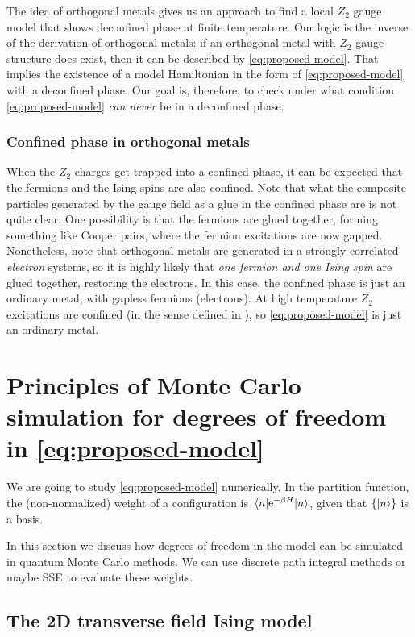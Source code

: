 \documentclass[hyperref, a4paper]{article}
\newcommand*{\ee}{\mathrm{e}}
\newcommand*{\Ztwo}{$\mathbb{Z}_2$ }
\newcommand*{\tfim}{transverse field Ising model}
\def\mathbb#1{#1}%
\begin{document}
The idea of orthogonal metals gives us an approach to find a local \Ztwo gauge model that shows deconfined phase at finite temperature.
Our logic is the inverse of the derivation of orthogonal metals: if an orthogonal metal with \Ztwo gauge structure does exist, then it can be described by \eqref{eq:proposed-model}.
That implies the existence of a model Hamiltonian in the form of \eqref{eq:proposed-model} with a deconfined phase.
Our goal is, therefore, to check under what condition \eqref{eq:proposed-model} \emph{can never} be in a deconfined phase.

\subsubsection{Confined phase in orthogonal metals}

When the \Ztwo charges get trapped into a confined phase, it can be expected that the fermions and the Ising spins are also confined.
Note that what the composite particles generated by the gauge field as a glue in the confined phase are is not quite clear.
One possibility is that the fermions are glued together, forming something like Cooper pairs, where the fermion excitations are now gapped.
Nonetheless, note that orthogonal metals are generated in a strongly correlated \emph{electron} systems, so it is highly likely that \emph{one fermion and one Ising spin} are glued together, restoring the electrons.
In this case, the confined phase is just an ordinary metal, with gapless fermions (electrons).
At high temperature \Ztwo excitations are confined (in the sense defined in ), so \eqref{eq:proposed-model} is just an ordinary metal.

\section{Principles of Monte Carlo simulation for degrees of freedom in \eqref{eq:proposed-model}}

We are going to study \eqref{eq:proposed-model} numerically.
In the partition function, the (non-normalized) weight of a configuration is $\mel{n}{\ee^{-\beta H}}{n}$, given that $\{\ket{n}\}$ is a basis.

In this section we discuss how degrees of freedom in the model can be simulated in quantum Monte Carlo methods.
We can use discrete path integral methods or maybe SSE to evaluate these weights.

\subsection{The 2D \tfim{}}
\end{document}
